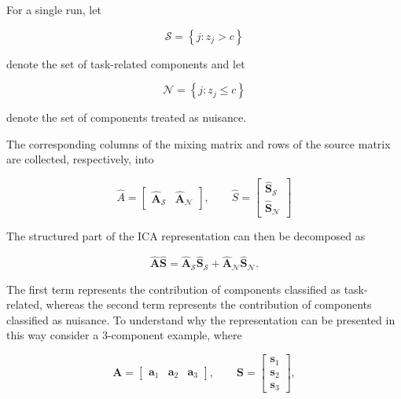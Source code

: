 \documentclass[english]{pwr_wmat_praca_dyplomowa}
\theoremstyle{definition}
\theoremstyle{remark}
\begin{document}
For a single run, let

\begin{equation}
    \mathcal{S} = \left\{j : z_j > c \right\}
\end{equation}

denote the set of task-related components and let

\begin{equation}
    \mathcal{N} = \left\{j : z_j \leq c\right\}
\end{equation}

denote the set of components treated as nuisance.

The corresponding columns of the mixing matrix and rows of the source matrix are collected, respectively, into

\begin{equation}
    \widehat{A} = 
    \begin{bmatrix}
        \widehat{\mathbf{A}}_{\mathcal{S}} & \widehat{\mathbf{A}}_{\mathcal{N}}
    \end{bmatrix},
    \qquad
    \widehat{S} =
    \begin{bmatrix}
        \widehat{\mathbf{S}}_{\mathcal{S}} \\
        \widehat{\mathbf{S}}_{\mathcal{N}}
    \end{bmatrix}
\end{equation}

The structured part of the ICA representation can then be decomposed as

\begin{equation}
    \widehat{\mathbf{A}} \widehat{\mathbf{S}}
    = \widehat{\mathbf{A}}_{\mathcal{S}} \widehat{\mathbf{S}}_{\mathcal{S}}
    + \widehat{\mathbf{A}}_{\mathcal{N}} \widehat{\mathbf{S}}_{\mathcal{N}}.
\end{equation}

The first term represents the contribution of components classified as task-related, whereas the second term represents the contribution of components classified as nuisance. To understand why the representation can be presented in this way consider a 3-component example, where

\begin{equation}
    \mathbf{A} = \begin{bmatrix}\mathbf{a}_1 & \mathbf{a}_2 & \mathbf{a}_3\end{bmatrix}, \qquad
    \mathbf{S} = \begin{bmatrix}\mathbf{s}_1 \\ \mathbf{s}_2 \\ \mathbf{s}_3\end{bmatrix},
\end{equation}
\end{document}
